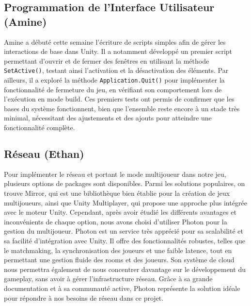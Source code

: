 \documentclass{report}
\begin{document}
\subsection*{Programmation de l'Interface Utilisateur (Amine)}
Amine a débuté cette semaine l’écriture de scripts simples afin de gérer les interactions de base dans Unity. Il a notamment développé un premier script permettant d’ouvrir et de fermer des fenêtres en utilisant la méthode \texttt{SetActive()}, testant ainsi l’activation et la désactivation des éléments. Par ailleurs, il a exploré la méthode \texttt{Application.Quit()} pour implémenter la fonctionnalité de fermeture du jeu, en vérifiant son comportement lors de l'exécution en mode build. Ces premiers tests ont permis de confirmer que les bases du système fonctionnent, bien que l’ensemble reste encore à un stade très minimal, nécessitant des ajustements et des ajouts pour atteindre une fonctionnalité complète.

\newpage %

\subsection*{Réseau (Ethan)}
Pour implémenter le réseau et portant le mode multijoueur dans notre jeu, plusieurs options de packages sont disponibles. Parmi les solutions populaires, on trouve Mirror, qui est une bibliothèque bien établie pour la création de jeux multijoueurs, ainsi que Unity Multiplayer, qui propose une approche plus intégrée avec le moteur Unity. Cependant, après avoir étudié les différents avantages et inconvénients de chaque option, nous avons choisi d'utiliser Photon pour la gestion du multijoueur. Photon est un service très apprécié pour sa scalabilité et sa facilité d'intégration avec Unity. Il offre des fonctionnalités robustes, telles que le matchmaking, la synchronisation des joueurs et une faible latence, tout en permettant une gestion fluide des rooms et des joueurs. Son système de cloud nous permettra également de nous concentrer davantage sur le développement du gameplay, sans avoir à gérer l'infrastructure réseau. Grâce à sa grande documentation et à sa communauté active, Photon représente la solution idéale pour répondre à nos besoins de réseau dans ce projet.
\end{document}
